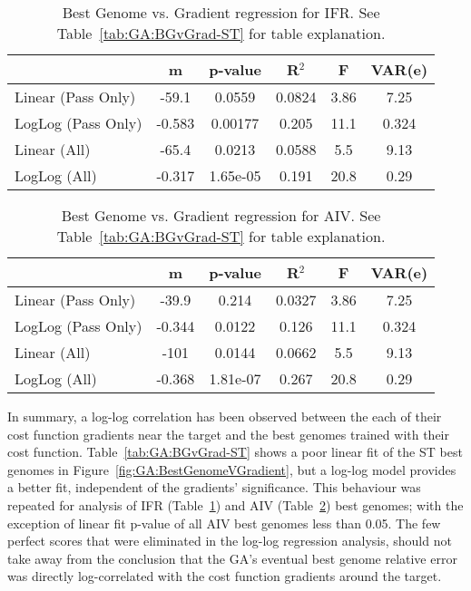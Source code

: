 \begin{table}[th]
  \centering
  \begin{tabular}{lccccc}
                   &   m    & p-value  & R$^2$  &   F  & VAR(e) \\[1ex] \hline
Linear (Pass Only) & -59.1  &  0.0559  & 0.0824 & 3.86 & 7.25    \\
LogLog (Pass Only) & -0.583 & 0.00177  & 0.205  & 11.1 & 0.324  \\[0.5ex] \hline
   Linear (All)    & -65.4  &  0.0213  & 0.0588 & 5.5  & 9.13     \\
   LogLog (All)    & -0.317 & 1.65e-05 & 0.191  & 20.8 & 0.29   \\[1ex] \hline    
\end{tabular}
  \caption{Best Genome vs. Gradient regression for IFR. See Table~\ref{tab:GA:BGvGrad-ST} for table explanation.}
  \label{tab:GA:BGvGrad-IFR}
\end{table}


\begin{table}[th]
  \centering
  \begin{tabular}{lccccc}
                   &   m    & p-value  & R$^2$  &  F   & VAR(e)\\[1ex] \hline
Linear (Pass Only) & -39.9  &  0.214   & 0.0327 & 3.86 & 7.25 \\
LogLog (Pass Only) & -0.344 &  0.0122  & 0.126  & 11.1 & 0.324\\[0.5ex] \hline
   Linear (All)    &  -101  &  0.0144  & 0.0662 & 5.5  & 9.13 \\
   LogLog (All)    & -0.368 & 1.81e-07 & 0.267  & 20.8 & 0.29 \\[1ex] \hline    
\end{tabular}
  \caption{Best Genome vs. Gradient regression for AIV.  See Table~\ref{tab:GA:BGvGrad-ST} for table explanation.}
  \label{tab:GA:BGvGrad-AIV}
\end{table}



In summary, a log-log correlation has been observed between the each
of their cost function gradients near the target and the best genomes
trained with their cost function. Table~\ref{tab:GA:BGvGrad-ST} shows
a poor linear fit of the ST best genomes in
Figure~\ref{fig:GA:BestGenomeVGradient}, but a log-log model provides
a better fit, independent of the gradients' significance. This
behaviour was repeated for analysis of IFR
(Table~\ref{tab:GA:BGvGrad-IFR}) and AIV
(Table~\ref{tab:GA:BGvGrad-AIV}) best genomes; with the exception of
linear fit p-value of all AIV best genomes less than 0.05.  The few
perfect scores that were eliminated in the log-log regression
analysis, should not take away from the conclusion that the GA's
eventual best genome relative error was directly log-correlated with
the cost function gradients around the target.





